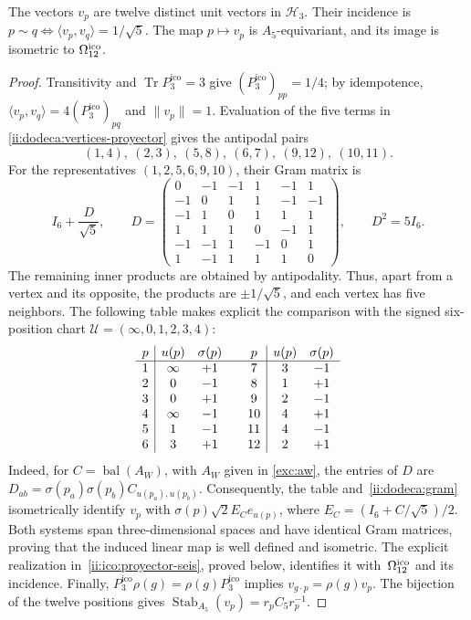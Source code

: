 \begin{proposition}
\label{ii:dodeca:realizacion}
The vectors \(v_p\) are twelve distinct unit vectors in
\(\mathcal H_3\). Their incidence is
\(p\sim q\Longleftrightarrow\langle v_p,v_q\rangle=1/\sqrt5\).
The map \(p\mapsto v_p\) is \(A_5\)-equivariant, and its image
is isometric to \(\Omega_{12}^{\rm ico}\).
\end{proposition}
\begin{proof}
Transitivity and \(\operatorname{Tr}P_3^{\mathrm{ico}}=3\) give
\((P_3^{\mathrm{ico}})_{pp}=1/4\); by idempotence,
\(\langle v_p,v_q\rangle=4(P_3^{\mathrm{ico}})_{pq}\) and \(\|v_p\|=1\).
Evaluation of the five terms in
\eqref{ii:dodeca:vertices-proyector} gives the antipodal pairs
\[
 (1,4),\ (2,3),\ (5,8),\ (6,7),\ (9,12),\ (10,11).
\]
For the representatives \((1,2,5,6,9,10)\), their Gram matrix is
\begin{equation}
 I_6+\frac D{\sqrt5},\qquad
 D=\begin{pmatrix}
 0&-1&-1&1&-1&1\\
 -1&0&1&1&-1&-1\\
 -1&1&0&1&1&1\\
 1&1&1&0&-1&1\\
 -1&-1&1&-1&0&1\\
 1&-1&1&1&1&0
 \end{pmatrix},\qquad D^2=5I_6.
 \label{ii:dodeca:gram}
\end{equation}
The remaining inner products are obtained by antipodality.
Thus, apart from a vertex and its opposite, the products are
\(\pm1/\sqrt5\), and each vertex has five neighbors. The following table
makes explicit the comparison with the signed six-position chart
\(\mathcal U=(\infty,0,1,2,3,4)\):
\begin{equation}
\begin{array}{c|cc@{\qquad}c|cc}
p&u(p)&\sigma(p)&p&u(p)&\sigma(p)\\ \hline
1&\infty&+1&7&3&-1\\
2&0&-1&8&1&+1\\
3&0&+1&9&2&-1\\
4&\infty&-1&10&4&+1\\
5&1&-1&11&4&-1\\
6&3&+1&12&2&+1
\end{array}
\label{ii:dodeca:carta-firmada}
\end{equation}
Indeed, for \(C=\operatorname{bal}(A_W)\), with \(A_W\) given in
\eqref{exc:aw}, the entries of \(D\) are
\(D_{ab}=\sigma(p_a)\sigma(p_b)C_{u(p_a),u(p_b)}\).
Consequently, the table and~\eqref{ii:dodeca:gram} isometrically
identify \(v_p\) with
\(\sigma(p)\sqrt2 E_Ce_{u(p)}\), where
\(E_C=(I_6+C/\sqrt5)/2\). Both systems span three-dimensional
spaces and have identical Gram matrices, proving that the induced
linear map is well defined and isometric. The explicit
realization in~\eqref{ii:ico:proyector-seis}, proved below,
identifies it with~\(\Omega_{12}^{\rm ico}\) and its incidence.
Finally, \(P_3^{\mathrm{ico}}\rho(g)=\rho(g)P_3^{\mathrm{ico}}\) implies
\(v_{g\cdot p}=\rho(g)v_p\). The bijection of the twelve positions gives
\(\operatorname{Stab}_{A_5}(v_p)=r_pC_5r_p^{-1}\).
\end{proof}

